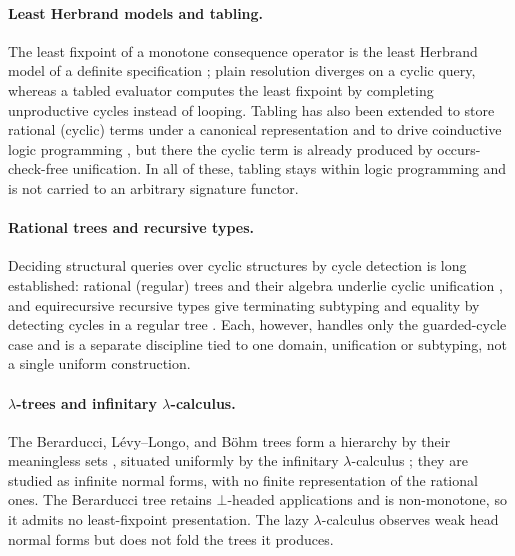 \paragraph{Least Herbrand models and tabling.}
The least fixpoint of a monotone consequence operator is the least Herbrand
model of a definite specification ; plain resolution diverges on a cyclic
query, whereas a tabled evaluator  computes the least fixpoint by
completing unproductive cycles instead of looping. Tabling has also been extended to store rational
(cyclic) terms under a canonical representation and to drive coinductive logic programming
, but there the cyclic term is already produced by occurs-check-free
unification. In all of these, tabling stays within logic programming and is not carried to an arbitrary
signature functor.

\paragraph{Rational trees and recursive types.}
Deciding structural queries over cyclic structures by cycle detection is long established: rational
(regular) trees and their algebra  underlie cyclic unification
, and equirecursive recursive types give terminating subtyping and equality by
detecting cycles in a regular tree . Each, however, handles
only the guarded-cycle case and is a separate discipline tied to one domain, unification or subtyping,
not a single uniform construction.

\paragraph{$\lambda$-trees and infinitary $\lambda$-calculus.}
The Berarducci, L\'evy--Longo, and B\"ohm trees form a hierarchy by their meaningless sets
, situated uniformly by the infinitary
$\lambda$-calculus ; they are studied as infinite normal forms,
with no finite representation of the rational ones. The Berarducci tree retains $\bot$-headed
applications and is non-monotone, so it admits no least-fixpoint presentation. The lazy
$\lambda$-calculus  observes weak head normal forms but does not fold the trees
it produces.

